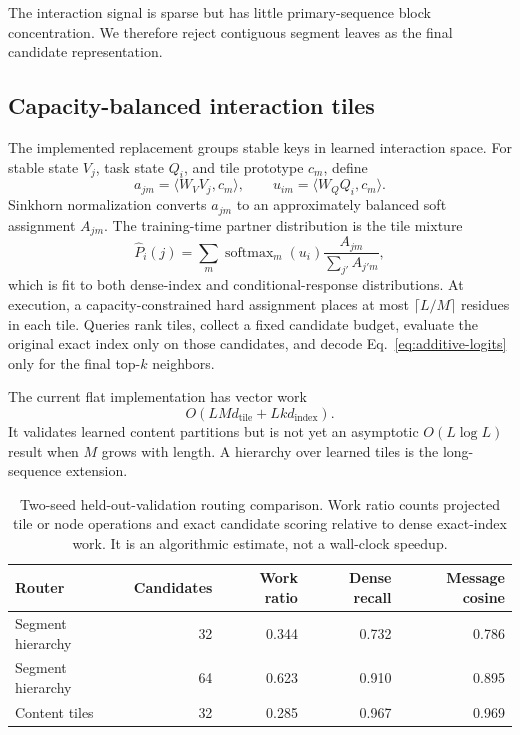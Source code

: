 \documentclass[10pt]{article}
\begin{document}
The interaction signal is sparse but has little primary-sequence block concentration.  We
therefore reject contiguous segment leaves as the final candidate representation.

\subsection{Capacity-balanced interaction tiles}

The implemented replacement groups stable keys in learned interaction space.  For stable state
$V_j$, task state $Q_i$, and tile prototype $c_m$, define
\begin{equation}
a_{jm}=\langle W_VV_j,c_m\rangle,\qquad
u_{im}=\langle W_QQ_i,c_m\rangle.
\end{equation}
Sinkhorn normalization converts $a_{jm}$ to an approximately balanced soft assignment $A_{jm}$.
The training-time partner distribution is the tile mixture
\begin{equation}
\widehat P_i(j)=\sum_m \operatorname{softmax}_m(u_i)
\frac{A_{jm}}{\sum_{j'}A_{j'm}},
\label{eq:tile-mixture}
\end{equation}
which is fit to both dense-index and conditional-response distributions.  At execution, a
capacity-constrained hard assignment places at most $\lceil L/M\rceil$ residues in each tile.
Queries rank tiles, collect a fixed candidate budget, evaluate the original exact index only on
those candidates, and decode Eq.~\ref{eq:additive-logits} only for the final top-$k$ neighbors.

The current flat implementation has vector work
\begin{equation}
O(LMd_{\mathrm{tile}}+Lk d_{\mathrm{index}}).
\end{equation}
It validates learned content partitions but is not yet an asymptotic $O(L\log L)$ result when
$M$ grows with length.  A hierarchy over learned tiles is the long-sequence extension.

\begin{table}[ht]
\centering
\small
\begin{tabular}{lrrrr}
\toprule
Router & Candidates & Work ratio & Dense recall & Message cosine \\
\midrule
Segment hierarchy & 32 & 0.344 & 0.732 & 0.786 \\
Segment hierarchy & 64 & 0.623 & 0.910 & 0.895 \\
Content tiles & 32 & 0.285 & 0.967 & 0.969 \\
\bottomrule
\end{tabular}
\caption{Two-seed held-out-validation routing comparison.  Work ratio counts projected tile or
node operations and exact candidate scoring relative to dense exact-index work.  It is an
algorithmic estimate, not a wall-clock speedup.}
\label{tab:tile-routing}
\end{table}
\FloatBarrier
\end{document}
